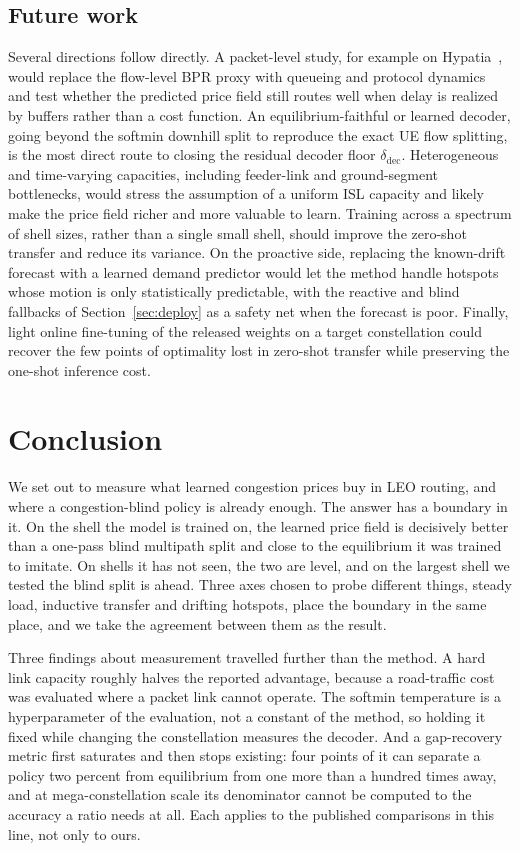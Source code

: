 \documentclass[journal]{IEEEtran}
\begin{document}
\subsection{Future work}\label{sec:future}
Several directions follow directly. A packet-level study, for example on
Hypatia~\cite{hypatia}, would replace the flow-level BPR proxy with queueing and protocol
dynamics and test whether the predicted price field still routes well when delay is
realized by buffers rather than a cost function. An equilibrium-faithful or learned decoder,
going beyond the softmin downhill split to reproduce the exact UE flow splitting, is the most
direct route to closing the residual decoder floor $\delta_{\mathrm{dec}}$.
Heterogeneous and time-varying capacities, including feeder-link and ground-segment
bottlenecks, would stress the assumption of a uniform ISL capacity and likely make the price
field richer and more valuable to learn. Training across a spectrum of shell sizes, rather
than a single small shell, should improve the zero-shot transfer and reduce its variance. On
the proactive side, replacing the known-drift forecast with a learned demand predictor would
let the method handle hotspots whose motion is only statistically predictable, with the
reactive and blind fallbacks of Section~\ref{sec:deploy} as a safety net when the forecast
is poor. Finally, light online fine-tuning of the released weights on a target constellation
could recover the few points of optimality lost in zero-shot transfer while preserving the
one-shot inference cost.

\section{Conclusion}
We set out to measure what learned congestion prices buy in LEO routing, and where a
congestion-blind policy is already enough. The answer has a boundary in it. On the shell the
model is trained on, the learned price field is decisively better than a one-pass blind
multipath split and close to the equilibrium it was trained to imitate. On shells it has not
seen, the two are level, and on the largest shell we tested the blind split is ahead. Three
axes chosen to probe different things, steady load, inductive transfer and drifting hotspots,
place the boundary in the same place, and we take the agreement between them as the result.

Three findings about measurement travelled further than the method. A hard link capacity roughly halves the reported advantage, because a road-traffic cost was evaluated where a packet link cannot operate. The softmin temperature is a hyperparameter of the evaluation, not a constant of the method, so holding it fixed while changing the constellation measures the decoder. And a gap-recovery metric first saturates and then stops existing: four points of it can separate a policy two percent from equilibrium from one more than a hundred times away, and at mega-constellation scale its denominator cannot be computed to the accuracy a ratio needs at all. Each applies to the published comparisons in this line, not only to ours.
\end{document}
